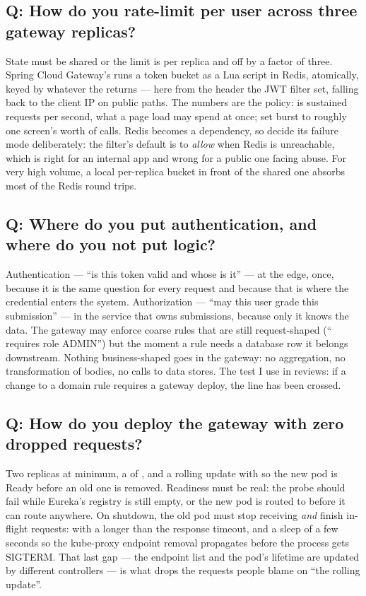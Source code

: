 \subsection*{Q: How do you rate-limit per user across three gateway replicas?}

State must be shared or the limit is per replica and off by a factor
of three. Spring Cloud Gateway's  runs a token
bucket as a Lua script in Redis, atomically, keyed by whatever the
 returns --- here  from the header
the JWT filter set, falling back to the client IP on public paths. The
numbers are the policy:  is sustained requests per
second,  what a page load may spend at once; set
burst to roughly one screen's worth of calls. Redis becomes a
dependency, so decide its failure mode deliberately: the filter's
default is to \emph{allow} when Redis is unreachable, which is right
for an internal app and wrong for a public one facing abuse. For very
high volume, a local per-replica bucket in front of the shared one
absorbs most of the Redis round trips.

\subsection*{Q: Where do you put authentication, and where do you not put logic?}

Authentication --- ``is this token valid and whose is it'' --- at the
edge, once, because it is the same question for every request and
because that is where the credential enters the system. Authorization
--- ``may this user grade this submission'' --- in the service that owns
submissions, because only it knows the data. The gateway may enforce
coarse rules that are still request-shaped (``
requires role ADMIN'') but the moment a rule needs a database row it
belongs downstream. Nothing business-shaped goes in the gateway:
no aggregation, no transformation of bodies, no calls to data stores.
The test I use in reviews: if a change to a domain rule requires a
gateway deploy, the line has been crossed.

\subsection*{Q: How do you deploy the gateway with zero dropped requests?}

Two replicas at minimum, a  of
, and a rolling update with
 so the new pod is Ready before an old one is
removed. Readiness must be real: the probe should fail while Eureka's
registry is still empty, or the new pod is routed to before it can
route anywhere. On shutdown, the old pod must stop receiving \emph{and}
finish in-flight requests:  with a
 longer than the
response timeout, and a  sleep of a few seconds so the
kube-proxy endpoint removal propagates before the process gets
SIGTERM. That last gap --- the endpoint list and the pod's lifetime are
updated by different controllers --- is what drops the requests people
blame on ``the rolling update''.

